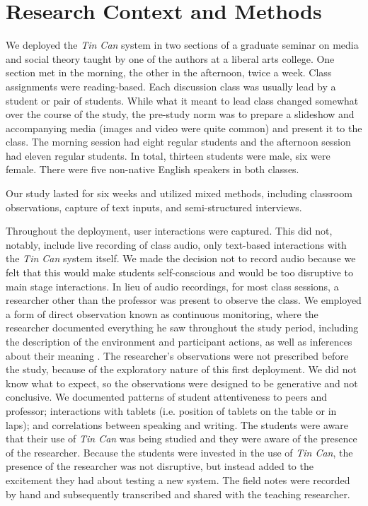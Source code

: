 

\section{Research Context and Methods}
We deployed the \emph{Tin Can} system in two sections of a graduate seminar on media and social theory taught by one of the authors at a liberal arts college. One section met in the morning, the other in the afternoon, twice a week. Class assignments were reading-based. Each discussion class was usually lead by a student or pair of students. While what it meant to lead class changed somewhat over the course of the study, the pre-study norm was to prepare a slideshow and accompanying media (images and video were quite common) and present it to the class. The morning session had eight regular students and the afternoon session had eleven regular students. In total, thirteen students were male, six were female. There were five non-native English speakers in both classes. 

Our study lasted for six weeks and utilized mixed methods, including classroom observations, capture of text inputs, and semi-structured interviews.

Throughout the deployment, user interactions were captured. This did not, notably, include live recording of class audio, only text-based interactions with the \emph{Tin Can} system itself. We made the decision not to record audio because we felt that this would make students self-conscious and would be too disruptive to main stage interactions.  In lieu of audio recordings, for most class sessions, a researcher other than the professor was present to observe the class. We employed a form of direct observation known as continuous monitoring, where the researcher documented everything he saw throughout the study period, including the description of the environment and participant actions, as well as inferences about their meaning \citep{interpersonal_interaction}. The researcher's observations were not prescribed before the study, because of the exploratory nature of this first deployment. We did not know what to expect, so the observations were designed to be generative and not conclusive.  We documented patterns of student attentiveness to peers and professor; interactions with tablets (i.e. position of tablets on the table or in laps); and correlations between speaking and writing. The students were aware that their use of \emph{Tin Can} was being studied and they were aware of the presence of the researcher. Because the students were invested in the use of \emph{Tin Can}, the presence of the researcher was not disruptive, but instead added to the excitement they had about testing a new system.  The field notes were recorded by hand and subsequently transcribed and shared with the teaching researcher. 

